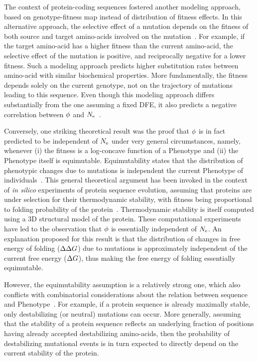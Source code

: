 The context of protein-coding sequences fostered another modeling approach, based on genotype-fitness map instead of distribution of fitness effects.
In this alternative approach, the selective effect of a mutation depends on the fitness of both source and target amino-acids involved on the mutation~\citep{Halpern1998, Rodrigue2010, Tamuri2012}.
For example, if the target amino-acid has a higher fitness than the current amino-acid, the selective effect of the mutation is positive, and reciprocally negative for a lower fitness.
Such a modeling approach predicts higher \gls{substitution} rates between amino-acid with similar biochemical properties.
More fundamentally, the fitness depends solely on the current genotype, not on the trajectory of mutations leading to this sequence.
Even though this modeling approach differs substantially from the one assuming a fixed \acrshort{DFE}, it also predicts a negative correlation between $\phi$ and $N_{\mathrm{e}}$~\citep{Spielman2015, DosReis2015}.

Conversely, one striking theoretical result was the proof that $\phi$ is in fact predicted to be independent of $N_{\mathrm{e}}$ under very general circumstances, namely, whenever (i) the fitness is a log-concave function of a \gls{Phenotype} and (ii) the \gls{Phenotype} itself is equimutable.
Equimutability states that the distribution of phenotypic changes due to mutations is independent the current \gls{Phenotype} of individuals~\citep{Cherry1998}.
This general theoretical argument has been invoked in the context of \textit{in silico} experiments of protein sequence evolution, assuming that proteins are under selection for their thermodynamic stability, with fitness being proportional to folding probability of the protein~\citep{Goldstein2013}.
Thermodynamic stability is itself computed using a 3D structural model of the protein.
These computational experiments have led to the observation that $\phi$ is essentially independent of $N_{\mathrm{e}}$.
An explanation proposed for this result is that the distribution of changes in free energy of folding ($\Delta \Delta G$) due to mutations is approximately independent of the current free energy ($\Delta G$), thus making the free energy of folding essentially equimutable.

However, the equimutability assumption is a relatively strong one, which also conflicts with combinatorial considerations about the relation between sequence and \gls{Phenotype}~\citep{Serohijos2012}.
For example, if a protein sequence is already maximally stable, only destabilizing (or neutral) mutations can occur.
More generally, assuming that the stability of a protein sequence reflects an underlying fraction of positions having already accepted destabilizing amino-acids, then the probability of destabilizing mutational events is in turn expected to directly depend on the current stability of the protein.

